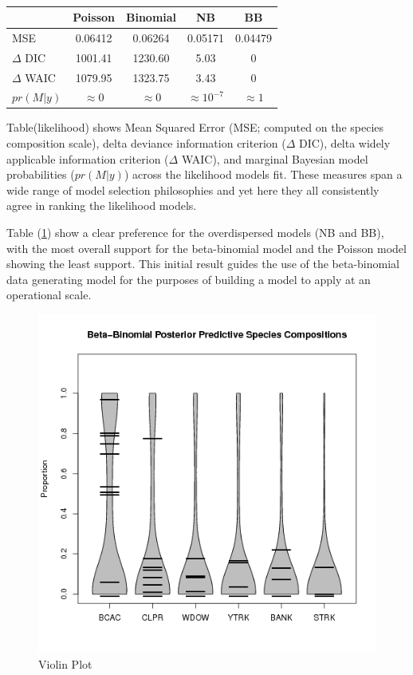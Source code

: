 \documentclass[12pt]{article}
\begin{document}
\begin{table}[h!]
\centering
\begin{tabular}[c]{@{}lcccc@{}}
\hline
& Poisson & Binomial & NB & BB \\ \hline
MSE & 0.06412 & 0.06264 & 0.05171 & 0.04479 \\ 
\(\Delta\) DIC & 1001.41 & 1230.60 & 5.03 & 0 \\
\(\Delta\) WAIC & 1079.95 & 1323.75 & 3.43 & 0 \\
\(pr(M|y)\) & \(\approx0\) & \(\approx0\) & \(\approx10^{-7}\) & \(\approx1\) \\ \hline
\end{tabular}
\caption{}
\label{likeTab}
\end{table}

Table(likelihood) shows Mean Squared Error (MSE; computed on the species
composition scale), delta deviance information criterion (\(\Delta\)
DIC), delta widely applicable information criterion (\(\Delta\) WAIC),
and marginal Bayesian model probabilities (\(pr(M|y)\)) across the
likelihood models fit. These measures span a wide range of model
selection philosophies and yet here they all consistently agree in
ranking the likelihood models.

Table (\ref{likeTab}) show a clear preference for the
overdispersed models (NB and BB), with the most overall support for the
beta-binomial model and the Poisson model showing the least support.
This initial result guides the use of the beta-binomial data generating
model for the purposes of building a model to apply at an operational
scale.

\begin{figure}[h!]
\centering
\includegraphics{./pictures/compVioplotQtr2.png}
\caption{Violin Plot}
\label{violin}
\end{figure}
\end{document}
